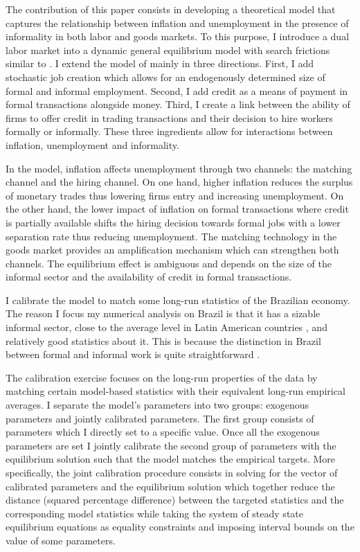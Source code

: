 \documentclass[12pt,a4paper,titlepage]{article}
\begin{document}
The contribution of this paper consists in developing a theoretical model that captures the relationship between inflation and unemployment in the presence of informality in both labor and goods markets. To this purpose, I introduce a dual labor market into a dynamic general equilibrium model with search frictions similar to \cite{Berentsen2011}. I extend the model of \cite{Berentsen2011} mainly in three directions. First, I add stochastic job creation which allows for an endogenously determined size of formal and informal employment. Second, I add credit as a means of payment in formal transactions alongside money. Third, I create a link between the ability of firms to offer credit in trading transactions and their decision to hire workers formally or informally. These three ingredients allow for interactions between inflation, unemployment and informality.

In the model, inflation affects unemployment through two channels: the matching channel and the hiring channel. On one hand, higher inflation reduces the surplus of monetary trades thus lowering firms entry and increasing unemployment. On the other hand, the lower impact of inflation on formal transactions where credit is partially available shifts the hiring decision towards formal jobs with a lower separation rate thus reducing unemployment. The matching technology in the goods market provides an amplification mechanism which can strengthen both channels. The equilibrium effect is ambiguous and depends on the size of the informal sector and the availability of credit in formal transactions. 

I calibrate the model to match some long-run statistics of the Brazilian economy. The reason I focus my numerical analysis on Brazil is that it has a sizable informal sector, close to the average level in Latin American countries \citep{Perry2007}, and relatively good statistics about it. This is because the distinction in Brazil between formal and informal work is quite straightforward \citep{Gerard2016}.

The calibration exercise focuses on the long-run properties of the data by matching certain model-based statistics with their equivalent long-run empirical averages. I separate the model's parameters into two groups: exogenous parameters and jointly calibrated parameters. The first group consists of parameters which I directly set to a specific value. Once all the exogenous parameters are set I jointly calibrate the second group of parameters with the equilibrium solution such that the model matches the empirical targets. More specifically, the joint calibration procedure consists in solving for the vector of calibrated parameters and the equilibrium solution which together reduce the distance (squared percentage difference) between the targeted statistics and the corresponding model statistics while taking the system of steady state equilibrium equations as equality constraints and imposing interval bounds on the value of some parameters.
\end{document}
